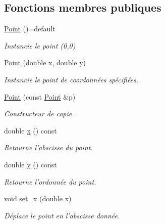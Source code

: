 \subsection*{Fonctions membres publiques}
\begin{DoxyCompactItemize}
\item 
\hypertarget{classPoint_a257415ad611a16bb73628efcdb87d0fd}{\hyperlink{classPoint_a257415ad611a16bb73628efcdb87d0fd}{Point} ()=default}\label{classPoint_a257415ad611a16bb73628efcdb87d0fd}

\begin{DoxyCompactList}\small\item\em Instancie le point (0,0) \end{DoxyCompactList}\item 
\hyperlink{classPoint_a78b55e8d5466bb8c2cf60fa55f2562ff}{Point} (double \hyperlink{classPoint_a3eef47b1c4849b3395a8f9c658ca7c4a}{x}, double \hyperlink{classPoint_a96e90df6b3c18e64c31abdf196e49ae9}{y})
\begin{DoxyCompactList}\small\item\em Instancie le point de coordonnées spécifiées. \end{DoxyCompactList}\item 
\hyperlink{classPoint_af0c0f20db1616447bc78184ed537ef6e}{Point} (const \hyperlink{classPoint}{Point} \&p)
\begin{DoxyCompactList}\small\item\em Constructeur de copie. \end{DoxyCompactList}\item 
double \hyperlink{classPoint_a3eef47b1c4849b3395a8f9c658ca7c4a}{x} () const 
\begin{DoxyCompactList}\small\item\em Retourne l'abscisse du point. \end{DoxyCompactList}\item 
double \hyperlink{classPoint_a96e90df6b3c18e64c31abdf196e49ae9}{y} () const 
\begin{DoxyCompactList}\small\item\em Retourne l'ordonnée du point. \end{DoxyCompactList}\item 
void \hyperlink{classPoint_adaaf2fe64c78448b3c8d6e121ae3bca0}{set\+\_\+x} (double \hyperlink{classPoint_a3eef47b1c4849b3395a8f9c658ca7c4a}{x})
\begin{DoxyCompactList}\small\item\em Déplace le point en l'abscisse donnée. \end{DoxyCompactList}\item 

\end{DoxyCompactItemize}

